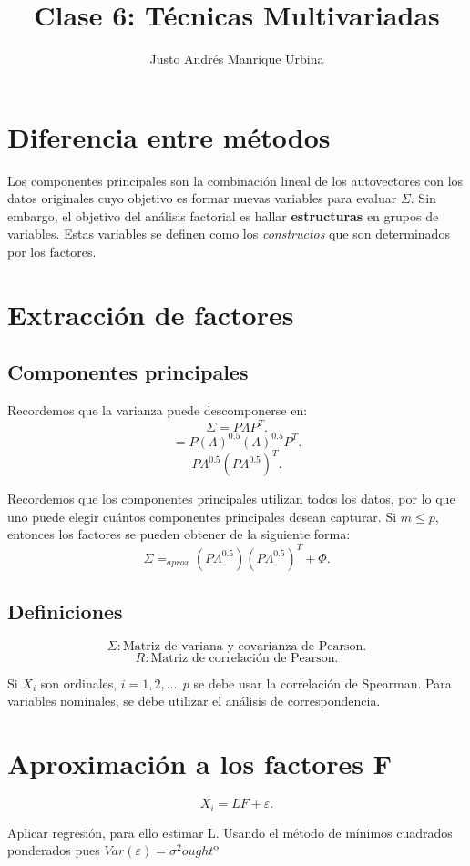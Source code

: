 \documentclass{article}
\title{Clase 6: Técnicas Multivariadas}
\author{Justo Andrés Manrique Urbina}
\begin{document}
\maketitle

\section{Diferencia entre métodos}
Los componentes principales son la combinación lineal de los autovectores con los datos originales cuyo objetivo es formar nuevas variables para evaluar $\Sigma$. Sin embargo, el objetivo del análisis factorial es hallar \textbf{estructuras} en grupos de variables. Estas variables se definen como los \textit{constructos} que son determinados por los factores.

\section{Extracción de factores}
\subsection{Componentes principales}
Recordemos que la varianza puede descomponerse en:
\[ \Sigma = P \Lambda P^{T}.\]
\[ = P {(\Lambda)}^{0.5}{(\Lambda)}^{0.5}P^{T}.\]
\[ P \Lambda^{0.5}{(P\Lambda^{0.5})}^{T}.\]

Recordemos que los componentes principales utilizan todos los datos, por lo que uno puede elegir cuántos componentes principales desean capturar. Si $m \leq p$, entonces los factores se pueden obtener de la siguiente forma:
\[ \Sigma =_{aprox} {(P\Lambda^{0.5})}{(P\Lambda^{0.5})}^{T}+\Phi.\]

\subsection{Definiciones}
\[ \Sigma: \text{Matriz de variana y covarianza de Pearson}.\]
\[ R: \text{Matriz de correlación de Pearson}.\]

Si $X_{i}$ son ordinales, $i=1,2,\ldots,p$ se debe usar la correlación de Spearman. Para variables nominales, se debe utilizar el análisis de correspondencia.

\section{Aproximación a los factores F}

\[ X_{i}=LF+\varepsilon.\]

Aplicar regresión, para ello estimar L. Usando el método de mínimos cuadrados ponderados pues $Var{(\varepsilon)}=\sigma^{2}oughtº$
\end{document}
